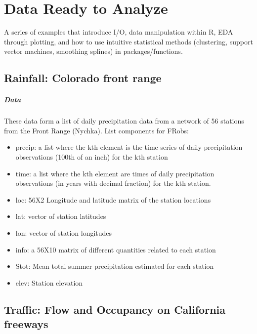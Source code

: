 
\chapter{Data Ready to Analyze}

A series of examples that introduce I/O,
data manipulation within R, EDA through plotting,
and how to use intuitive statistical methods (clustering, support vector machines,
smoothing splines) in packages/functions.

\section{Rainfall: Colorado front range}

\paragraph{Data}
These data form a list of daily precipitation data from a network of 56 stations 
from the Front Range (Nychka).  List components for FRobs:

\begin{itemize}
\item precip: a list where the kth element is the time series of daily precipitation observations (100th of an inch) for the kth station
\item time: a list where the kth element are times of daily precipitation observations (in years with decimal fraction) for the kth station.
\item     loc: 56X2 Longitude and latitude matrix of the station locations
\item  lat: vector of station latitudes
\item lon: vector of station longitudes
\item  info: a 56X10 matrix of different quantities related to each station
\item Stot: Mean total summer precipitation estimated for each station
\item  elev: Station elevation 
\end{itemize}

\section{Traffic: Flow and Occupancy on California freeways} 

